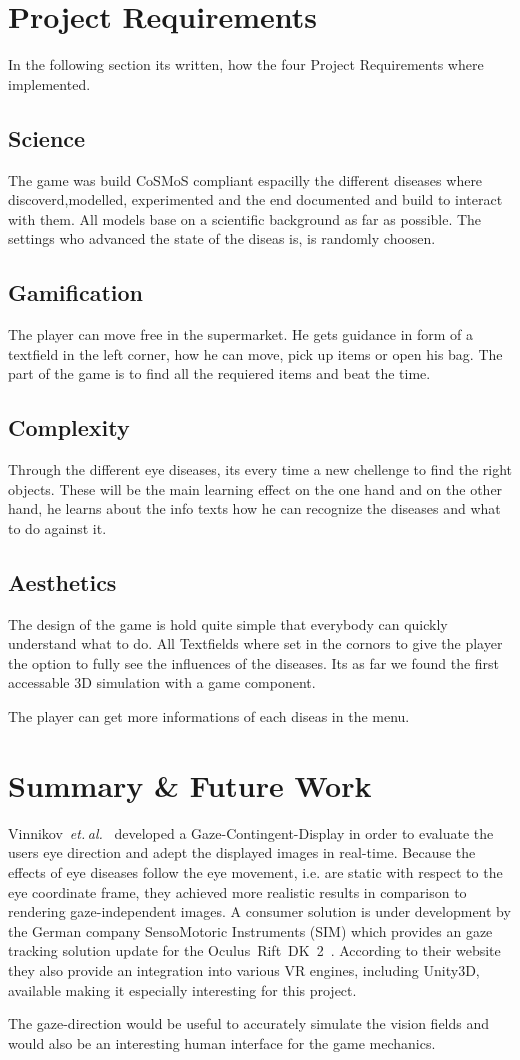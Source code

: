 \documentclass{acm_proc_article-sp}
\newcommand{\etal}{\textit{et. al.}}
\begin{document}
\section{Project Requirements}
In the following section its written, how the four Project Requirements where implemented.
\subsection{Science}
The game was build CoSMoS compliant espacilly the different diseases where discoverd,modelled, experimented and the end documented and build to interact with them. All models base on a scientific background as far as possible. The settings who advanced the state of the diseas is, is randomly choosen.

\subsection{Gamification}
The player can move free in the supermarket. He gets guidance in form of a textfield in the left corner, how he can move, pick up items or open his bag. The part of the game is to find all the requiered items and beat the time.

\subsection{Complexity}
Through the different eye diseases, its every time a new chellenge to find the right objects. These will be the main learning effect on the one hand and on the other hand, he learns about the info texts how he can recognize the diseases and what to do against it.

\subsection{Aesthetics}
The design of the game is hold quite simple that everybody can quickly understand what to do. All Textfields where set in the cornors to give the player the option to fully see the influences of the diseases. Its as far we found the first accessable 3D simulation with a game component.

The player can get more informations of each diseas in the menu.

%
%
\section{Summary \& Future Work}
Vinnikov \etal \cite{gazedisplays} developed a Gaze-Contingent-Display in order to evaluate the users eye direction and adept the displayed images in real-time.
Because the effects of eye diseases follow the eye movement, i.e. are static with respect to the eye coordinate frame, they achieved more realistic results in comparison to rendering gaze-independent images.
A consumer solution is under development by the German company SensoMotoric Instruments (SIM) which provides an gaze tracking solution update for the Oculus Rift DK 2 \cite{smi-oculus, arstechoculus}.
According to their website they also provide an integration into various VR engines, including Unity3D, available making it especially interesting for this project.

The gaze-direction would be useful to accurately simulate the vision fields and would also be an interesting human interface for the game mechanics.
%
\printbibliography

\balancecolumns
\end{document}

